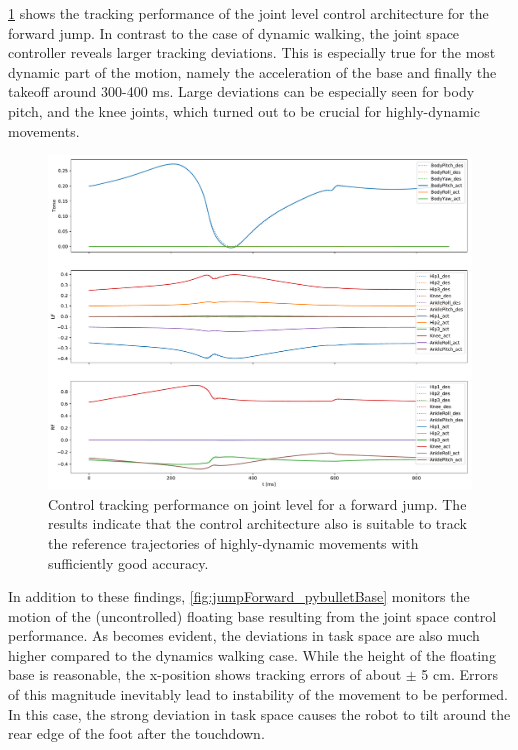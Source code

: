 \cref{fig:jumpForward_pybulletTracking} shows the tracking performance of the joint level control architecture for the forward jump. In contrast to the case of dynamic walking, the joint space controller reveals larger tracking deviations. This is especially true for the most dynamic part of the motion, namely the acceleration of the base and finally the takeoff around 300-400 ms. Large deviations can be especially seen for body pitch, and the knee joints, which turned out to be crucial for highly-dynamic movements. 

\begin{figure}[h!]
\centering	
\includegraphics[width=.85\textwidth]{fig/jumpForward/pybullet/pybulletTracking}
\caption[Control tracking performance on joint level for a forward jump]{Control tracking performance on joint level for a forward jump. The results indicate that the control architecture also is suitable to track the reference trajectories of highly-dynamic movements with sufficiently good accuracy.}
\label{fig:jumpForward_pybulletTracking}
\end{figure}

In addition to these findings, \cref{fig:jumpForward_pybulletBase} monitors the motion of the (uncontrolled) floating base resulting from the joint space control performance. As becomes evident, the deviations in task space are also much higher compared to the dynamics walking case. While the height of the floating base is reasonable, the x-position shows tracking errors of about $\pm$ 5 cm. Errors of this magnitude inevitably lead to instability of the movement to be performed. In this case, the strong deviation in task space causes the robot to tilt around the rear edge of the foot after the touchdown. 

